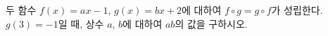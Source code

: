 두 함수 $f(x)=ax-1$, $g(x)=bx+2$에 대하여 $f\circ g=g\circ f$가 성립한다. $g(3)=-1$일 때, 상수 $a$, $b$에 대하여 $ab$의 값을 구하시오.
